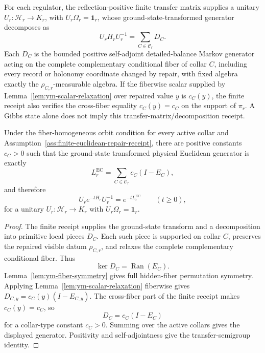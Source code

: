 \begin{assumption}
\label{ass:finite-euclidean-repair-receipt}
For each regulator, the reflection-positive finite transfer matrix supplies a unitary
\(U_r:\mathcal H_r\to K_r\), with \(U_r\Omega_r=\mathbf 1_r\), whose ground-state-transformed
generator decomposes as
\[
U_rH_rU_r^{-1}=\sum_{C\in\mathcal C_r}D_C.
\]
Each \(D_C\) is the bounded positive self-adjoint detailed-balance Markov generator acting on the
complete complementary conditional fiber of collar \(C\), including every record or holonomy
coordinate changed by repair, with fixed algebra exactly the
\(\rho_{C,r}\)-measurable algebra. If the fiberwise scalar supplied by
Lemma~\ref{lem:ym-scalar-relaxation} over repaired value \(y\) is \(c_C(y)\), the finite receipt
also verifies the cross-fiber equality \(c_C(y)=c_C\) on the support of \(\pi_r\). A Gibbs state
alone does not imply this transfer-matrix/decomposition receipt.
\end{assumption}

\begin{theorem}
\label{thm:euclidean-consensus-law}
Under the fiber-homogeneous orbit condition for every active collar and
Assumption~\ref{ass:finite-euclidean-repair-receipt}, there are positive constants
\(c_C>0\) such that the ground-state transformed physical Euclidean
generator is exactly
\[
L_r^{\mathrm{EC}}=\sum_{C\in\mathcal C_r} c_C(I-E_C),
\]
and therefore
\[
U_r e^{-tH_r}U_r^{-1}=e^{-tL_r^{\mathrm{EC}}}\qquad(t\ge 0),
\]
for a unitary \(U_r:\mathcal H_r\to K_r\) with \(U_r\Omega_r=\mathbf 1_r\).
\end{theorem}

\begin{proof}
The finite receipt supplies the ground-state transform and a decomposition into primitive local
pieces \(D_C\). Each such piece is supported on collar \(C\), preserves the repaired visible datum
\(\rho_{C,r}\), and relaxes the complete complementary conditional fiber. Thus
\[
\ker D_C=\operatorname{Ran}(E_C).
\]
Lemma~\ref{lem:ym-fiber-symmetry} gives full hidden-fiber permutation symmetry. Applying
Lemma~\ref{lem:ym-scalar-relaxation} fiberwise gives
\(D_{C,y}=c_C(y)(I-E_{C,y})\). The cross-fiber part of the finite receipt makes
\(c_C(y)=c_C\), so
\[
D_C=c_C(I-E_C)
\]
for a collar-type constant \(c_C>0\). Summing over the active collars gives the displayed
generator. Positivity and self-adjointness give the transfer-semigroup identity.
\end{proof}

